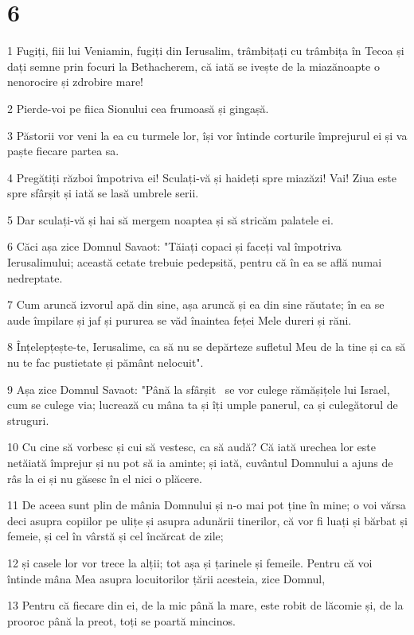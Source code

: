 \chapter{6}

\par 1 Fugiți, fiii lui Veniamin, fugiți din Ierusalim, trâmbițați cu trâmbița în Tecoa și dați semne prin focuri la Bethacherem, că iată se ivește de la miazănoapte o nenorocire și zdrobire mare!
\par 2 Pierde-voi pe fiica Sionului cea frumoasă și gingașă.
\par 3 Păstorii vor veni la ea cu turmele lor, își vor întinde corturile împrejurul ei și va paște fiecare partea sa.
\par 4 Pregătiți război împotriva ei! Sculați-vă și haideți spre miazăzi! Vai! Ziua este spre sfârșit și iată se lasă umbrele serii.
\par 5 Dar sculați-vă și hai să mergem noaptea și să stricăm palatele ei.
\par 6 Căci așa zice Domnul Savaot: "Tăiați copaci și faceți val împotriva Ierusalimului; această cetate trebuie pedepsită, pentru că în ea se află numai nedreptate.
\par 7 Cum aruncă izvorul apă din sine, așa aruncă și ea din sine răutate; în ea se aude împilare și jaf și pururea se văd înaintea feței Mele dureri și răni.
\par 8 Înțelepțește-te, Ierusalime, ca să nu se depărteze sufletul Meu de la tine și ca să nu te fac pustietate și pământ nelocuit".
\par 9 Așa zice Domnul Savaot: "Până la sfârșit  se vor culege rămășițele lui Israel, cum se culege via; lucrează cu mâna ta și îți umple panerul, ca și culegătorul de struguri.
\par 10 Cu cine să vorbesc și cui să vestesc, ca să audă? Că iată urechea lor este netăiată împrejur și nu pot să ia aminte; și iată, cuvântul Domnului a ajuns de râs la ei și nu găsesc în el nici o plăcere.
\par 11 De aceea sunt plin de mânia Domnului și n-o mai pot ține în mine; o voi vărsa deci asupra copiilor pe ulițe și asupra adunării tinerilor, că vor fi luați și bărbat și femeie, și cel în vârstă și cel încărcat de zile;
\par 12 și casele lor vor trece la alții; tot așa și țarinele și femeile. Pentru că voi întinde mâna Mea asupra locuitorilor țării acesteia, zice Domnul,
\par 13 Pentru că fiecare din ei, de la mic până la mare, este robit de lăcomie și, de la prooroc până la preot, toți se poartă mincinos.
